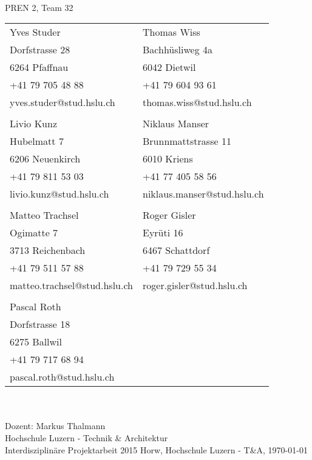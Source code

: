 \begin{titlepage}
    \begin{center}
        \parindent0pt{\Huge\bfseries \myDokumentTyp}\\[0.5cm]
		{\huge PREN 2, Team 32}\\[2em]
        \begin{tabular}{ll}
            Yves Studer                & Thomas Wiss \\
            Dorfstrasse 28             & Bachhüsliweg 4a \\
            6264 Pfaffnau              & 6042 Dietwil \\
            +41 79 705 48 88           & +41 79 604 93 61 \\
            yves.studer@stud.hslu.ch   & thomas.wiss@stud.hslu.ch \\
                                       & \\
            Livio Kunz                 & Niklaus Manser \\
            Hubelmatt 7                & Brunnmattstrasse 11\\
            6206 Neuenkirch            & 6010 Kriens \\
            +41 79 811 53 03           & +41 77 405 58 56 \\
            livio.kunz@stud.hslu.ch    & niklaus.manser@stud.hslu.ch \\
                                       & \\
            Matteo Trachsel			   & Roger Gisler \\
            Ogimatte 7                 & Eyrüti 16\\
            3713 Reichenbach           & 6467 Schattdorf\\
            +41 79 511 57 88           & +41 79 729 55 34 \\
            matteo.trachsel@stud.hslu.ch & roger.gisler@stud.hslu.ch \\
            						   & \\
            Pascal Roth			       & \\
            Dorfstrasse 18			   & \\
            6275 Ballwil		       & \\
            +41 79 717 68 94	       & \\
            pascal.roth@stud.hslu.ch   & \\
        \end{tabular}\\
        \vspace{3em}
        {\Huge \myTitel}\\[5em]
        Dozent: Markus Thalmann\\[2em]
        Hochschule Luzern - Technik \& Architektur\\   
        Interdisziplinäre Projektarbeit 2015
        \vfill{}
        Horw, Hochschule Luzern - T\&A, \today
    \end{center}
\end{titlepage}